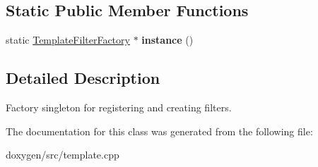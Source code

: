 \subsection*{Static Public Member Functions}
\begin{DoxyCompactItemize}
\item 
\mbox{\label{class_template_filter_factory_a553dc85390cf5bffc2dff949fb2e6963}} 
static \mbox{\hyperlink{class_template_filter_factory}{Template\+Filter\+Factory}} $\ast$ {\bfseries instance} ()
\end{DoxyCompactItemize}


\subsection{Detailed Description}
Factory singleton for registering and creating filters. 

The documentation for this class was generated from the following file\+:\begin{DoxyCompactItemize}
\item 
doxygen/src/template.\+cpp\end{DoxyCompactItemize}
